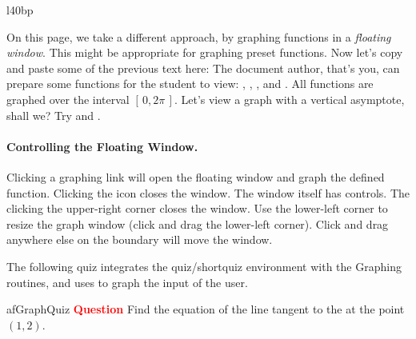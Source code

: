 \documentclass{article}
\begin{document}
\begin{wrapfigure}[3]{l}{40bp}%
\vspace{-\baselineskip}
\iconFloatGraphScreen[poster=aflogo]{40bp}{!}
\end{wrapfigure}%
On this page, we take a different approach, by graphing functions
in a \textsl{floating window}. This might be appropriate for graphing
preset functions. Now let's copy and paste some of the previous text
here: The document author, that's you, can prepare some functions
for the student to view:
,
,
, and
.
All functions are graphed over the interval
$[\,0, 2\pi\,]$. Let's view a graph with a vertical asymptote, shall we?
Try 
and .


\makebox[\linewidth][c]{\rule{.67\linewidth}{.4pt}}

\parskip6pt

\paragraph*{Controlling the Floating Window.} Clicking a graphing
link will open the floating window and graph the defined function.
Clicking the {\AcroFLeX} icon closes the window. The window itself
has controls. The clicking the upper-right corner closes the window.
Use the lower-left corner to resize the graph window (click and drag
the lower-left corner). Click and drag anywhere else on the boundary
will move the window.

\makebox[\linewidth][c]{\rule{.67\linewidth}{.4pt}}

The following quiz integrates the quiz/shortquiz environment with
the {\AcroFLeX} Graphing routines, and uses \texttt{\string{}}
to graph the input of the user.

\begin{oQuestion}{afGraphQuiz}
%
\textbf{\textcolor{red}{Question}} Find the equation of the line
tangent to the  at the
    {point $ (1,2) $}. \hfill{}\kern1bp\sqClearButton

\end{oQuestion}
\end{document}
